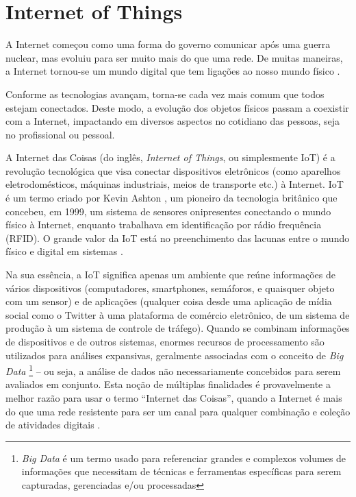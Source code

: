 \section{Internet of Things}
\label{sec:iot}

A Internet começou como uma forma do governo comunicar após uma guerra nuclear, mas evoluiu para ser muito mais do que uma rede. De muitas maneiras, a Internet tornou-se um mundo digital que tem ligações ao nosso mundo físico \cite{BrasilEscola}.

Conforme as tecnologias avançam, torna-se cada vez mais comum que todos estejam conectados. Deste modo, a evolução dos objetos físicos passam a coexistir com a Internet, impactando em diversos aspectos no cotidiano das pessoas, seja no profissional ou pessoal.

A Internet das Coisas (do inglês, \textit{Internet of Things}, ou simplesmente IoT) é a revolução tecnológica que visa conectar dispositivos eletrônicos (como aparelhos eletrodomésticos, máquinas industriais, meios de transporte etc.) à Internet. IoT é um termo criado por Kevin Ashton \cite{Kevin}, um pioneiro da tecnologia britânico que concebeu, em 1999, um sistema de sensores onipresentes conectando o mundo físico à Internet, enquanto trabalhava em identificação por rádio frequência (RFID). O grande valor da IoT está no preenchimento das lacunas entre o mundo físico e digital em sistemas \cite{Amazon}.

Na sua essência, a IoT significa apenas um ambiente que reúne informações de vários dispositivos (computadores, smartphones, semáforos, e quaisquer objeto com um sensor) e de aplicações (qualquer coisa desde uma aplicação de mídia social como o Twitter à uma plataforma de comércio eletrônico, de um sistema de produção à um sistema de controle de tráfego). Quando se combinam informações de dispositivos e de outros sistemas, enormes recursos de processamento são utilizados para análises expansivas, geralmente associadas com o conceito de \textit{Big Data} \footnote{\textit{Big Data} é um termo usado para referenciar grandes e complexos volumes de informações que necessitam de técnicas e ferramentas específicas para serem capturadas, gerenciadas e/ou processadas} – ou seja, a análise de dados não necessariamente concebidos para serem avaliados em conjunto. Esta noção de múltiplas finalidades é provavelmente a melhor razão para usar o termo “Internet das Coisas”, quando a Internet é mais do que uma rede resistente para ser um canal para qualquer combinação e coleção de atividades digitais \cite{ComputerWorld}.

